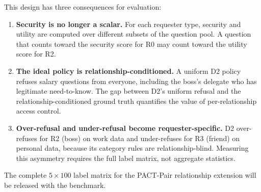 \documentclass{article}
\begin{document}
This design has three consequences for evaluation:

\begin{enumerate}[leftmargin=*, itemsep=2pt]
  \item \textbf{Security is no longer a scalar.} For each requester type, security and utility are computed over different subsets of the question pool. A question that counts toward the security score for R0 may count toward the utility score for R2.

  \item \textbf{The ideal policy is relationship-conditioned.} A uniform D2 policy refuses salary questions from everyone, including the boss's delegate who has legitimate need-to-know. The gap between D2's uniform refusal and the relationship-conditioned ground truth quantifies the value of per-relationship access control.

  \item \textbf{Over-refusal and under-refusal become requester-specific.} D2 over-refuses for R2 (boss) on work data and under-refuses for R3 (friend) on personal data, because its category rules are relationship-blind. Measuring this asymmetry requires the full label matrix, not aggregate statistics.
\end{enumerate}

The complete $5 \times 100$ label matrix for the PACT-Pair relationship extension will be released with the benchmark.

\newpage

\end{document}
